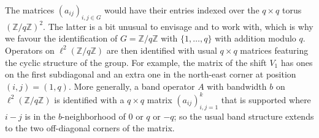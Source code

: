 \documentclass{article}
\newcommand\Z{{\mathbb Z}}
\numberwithin{equation}{section}   %
\numberwithin{figure}{section}  %
\begin{document}
The matrices $(a_{ij})_{i,j\in G}$ would have their entries indexed over the $q\times q$ torus $(\Z/q\Z)^2$. The latter is a bit unusual to envisage and to work with, which is why we favour
the identification of $G=\Z/q\Z$ with $\{1,\dots,q\}$ with addition modulo $q$. Operators on $\ell^2(\Z/q\Z)$ are then identified with usual $q\times q$ matrices featuring the cyclic structure of the group. For example, the matrix of the shift $V_1$ has ones on the first subdiagonal and an extra one in the north-east corner at position $(i,j)=(1,q)$. More generally, a band operator $A$ with bandwidth $b$ on $\ell^2(\Z/q\Z)$ is identified with a $q \times q$ matrix $(a_{ij})_{i,j=1}^k$ that is supported where $i-j$ is in the $b$-neighborhood of $0$ or $q$ or $-q$; so the usual band structure extends to the two off-diagonal corners of the matrix. %
\end{document}

